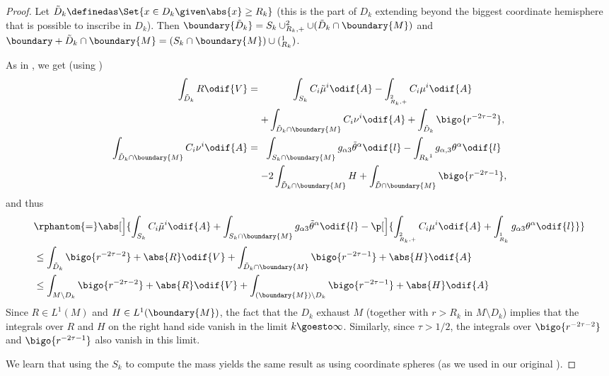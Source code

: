 \documentclass[titlepage,numbers=noenddot,headinclude,oneside,%
footinclude=true,cleardoublepage=empty,%
BCOR=5mm,paper=a4,fontsize=11pt,%
english,%
]{scrartcl}
\let\sphere\relax
\newcommand{\sphere}{\mathbb{S}}
\begin{document}
\begin{proof}
    Let \( \tilde{D}_k\definedas \Set{x\in D_k\given \abs{x}\geq R_k} \) (this is the part of \( D_k \) extending beyond the biggest coordinate hemisphere that is possible to inscribe in \( D_k \)). Then \( \boundary{\tilde{D}_k}=S_k \cup \sphere^2_{R_k,+}\cup (\tilde{D}_k\cap \boundary{M}) \) and \( \boundary+{\tilde{D}_k\cap \boundary{M}}=(S_k\cap \boundary{M})\cup (\sphere^1_{R_k}) \).



    As in \cite[Proposition 3.7]{almarazPositiveMassTheorem2016}, we get (using \cite[Equations 3.16 and 3.17]{almarazPositiveMassTheorem2016})
    \begin{align*}
        \int_{\tilde{D}_k}{R}\odif{V}&=\begin{gathered}[t]
            \int_{S_k}C_i\tilde{\mu}^i \odif{A}-\int_{\sphere^2_{R_k,+}}C_i\mu^i\odif{A}\\
            +\int_{\tilde{D}_k \cap \boundary{M}}C_i\nu^i \odif{A}+\int_{\tilde{D}_k}\bigo{r^{-2\tau-2}},
        \end{gathered}\\
        \int_{\tilde{D}_k\cap \boundary{M}}C_i \nu^i\odif{A}&=\begin{gathered}[t]
            \int_{S_k\cap \boundary{M}}g_{\alpha 3}\tilde{\theta}^\alpha\odif{l}-\int_{\sphere{R_k}^1}g_{\alpha,3}\theta^\alpha\odif{l}\\
                -2\int_{\tilde{D}_k\cap \boundary{M}}H+\int_{\tilde{D}\cap \boundary{M}}\bigo{r^{-2\tau-1}},
        \end{gathered}
    \end{align*}
    and thus
    \begin{equation*}
        \begin{aligned}[t]
        &\rphantom{=}\abs[\Big]{\int_{S_k}C_i \tilde{\mu}^i \odif{A}+\int_{S_k\cap \boundary{M}}g_{\alpha 3}\tilde{\theta}^\alpha\odif{l}-\p[\Big]{\int_{\sphere^2_{R_k,+}}C_i\mu^i \odif{A}+\int_{\sphere^1_{R_k}}g_{\alpha 3}\theta^\alpha\odif{l}}}\\
        &\leq \int_{\tilde{D}_k}\bigo{r^{-2\tau-2}}+\abs{R}\odif{V}+\int_{\tilde{D}_k\cap \boundary{M}}\bigo{r^{-2\tau-1}}+\abs{H}\odif{A}\\
        &\leq \int_{M\setminus D_k}\bigo{r^{-2\tau-2}}+\abs{R}\odif{V}+\int_{(\boundary{M})\setminus D_k}\bigo{r^{-2\tau-1}}+\abs{H}\odif{A}\\
        \end{aligned}
    \end{equation*}
    Since \( R\in L^1(M) \) and \( H\in L^1(\boundary{M}) \), the fact that the \( D_k \) exhaust \( M \) (together with \( r>R_k \) in \( M\setminus D_k \)) implies that the integrals over \( R \) and \( H \) on the right hand side vanish in the limit \( k\goesto \infty \). Similarly, since \( \tau>1/2 \), the integrals over \( \bigo{r^{-2\tau-2}} \) and \( \bigo{r^{-2\tau-1}} \) also vanish in this limit. 
     
    We learn that using the \( S_k \) to compute the mass yields the same result as using coordinate spheres (as we used in our original ).
\end{proof}
\printbibliography
\end{document}
